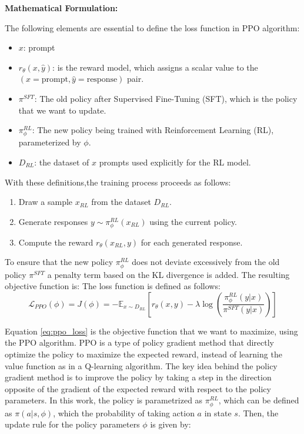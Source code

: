 \textbf{Mathematical Formulation:}


The following elements are essential to define the loss function in PPO algorithm:

\begin{itemize}
    \item $x$: prompt 
    \item $r_{\theta}(x,\hat{y})$: is the reward model, which assigns a scalar value to 
    the $(x=\text{prompt}, \hat{y}=\text{response})$ pair.
    \item $\pi^{SFT}$: The old policy after Supervised Fine-Tuning (SFT), which is the policy that we want to update.
    \item $\pi^{RL}_{\phi}$: The new policy being trained with Reinforcement Learning (RL), parameterized 
    by $\phi$.
    \item $D_{RL}$: the dataset of $x$ prompts used explicitly for the RL model.
\end{itemize}

With these definitions,the training process proceeds as follows:


\begin{enumerate}
    \item Draw a sample $x_{RL}$ from the dataset $D_{RL}$.
    \item Generate responses $y \sim \pi^{RL}_{\phi}(x_{RL})$ using the current policy.
    \item Compute the reward $r_{\theta}(x_{RL}, y)$ for each generated response.
\end{enumerate}

To ensure that the new policy $\pi^{RL}_{\phi}$ does not deviate excessively from the old policy $\pi^{SFT}$ a penalty term based on the KL divergence is added. The resulting objective function is:
The loss function is defined as follows:
\begin{equation}
    \mathcal{L}_{PPO} (\phi) = J(\phi)  = - \mathbb{E}_{x \sim D_{RL}} \left[ r_{\theta}(x, y) - \lambda \log(\frac{\pi^{RL}_{\phi}(y|x)}
    {\pi^{SFT}(y|x)}) 
    \right]
    \label{eq:ppo_loss}
\end{equation}

Equation \ref{eq:ppo_loss} is the objective function that we want to maximize, 
using the PPO algorithm. PPO is a type of policy gradient method \cite{mnihAsynchronousMethodsDeep2016}
that directly optimize the policy to maximize the expected reward, instead of learning the value function as in 
a Q-learning algorithm. The key idea behind the policy gradient method is to improve the 
policy by taking a step in the direction opposite of the gradient of the expected reward with respect to the policy parameters. In this work, the policy is parametrized as $\pi^{RL}_{\phi}$, which can be defined as  $\pi(a|s, \phi)$, which the probability of taking action $a$ in state $s$. Then, the update rule for the policy parameters $\phi$ is given by:

